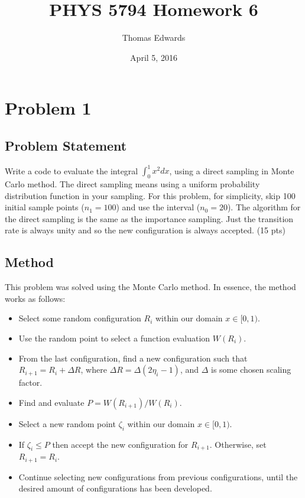 \documentclass[10pt,letter]{article}
\begin{document}
\begin{titlepage}
\title{PHYS 5794 Homework 6}
\date{April 5, 2016}
\author{Thomas Edwards}
\maketitle
\end{titlepage}

\section{Problem 1}

\subsection{Problem Statement}
Write a code to evaluate the integral $\int_0^1 x^2 dx$, using a direct sampling in Monte Carlo method. The
direct sampling means using a uniform probability distribution function in your sampling. For this
problem, for simplicity, skip 100 initial sample points ($n_1 = 100$) and use the interval ($n_0 = 20$). The
algorithm for the direct sampling is the same as the importance sampling. Just the transition rate
is always unity and so the new configuration is always accepted. (15 pts)

\subsection{Method}

This problem was solved using the Monte Carlo method. In essence, the method works as follows:

\begin{itemize}
\item Select some random configuration $R_i$ within our domain $x \in [0,1).$
\item Use the random point to select a function evaluation $W(R_i).$
\item From the last configuration, find a new configuration such that $R_{i+1} = R_i + \Delta R$, where $\Delta R = \Delta(2\eta_i-1)$, and $\Delta$ is some chosen scaling factor.
\item Find and evaluate $P = W(R_{i+1})/W(R_{i})$.
\item Select a new random point $\zeta_i$  within our domain $x \in [0,1).$
\item If $\zeta_i \le P$ then accept the new configuration for $R_{i+1}$. Otherwise, set $R_{i+1}=R_i$.
\item Continue selecting new configurations from previous configurations, until the desired amount of configurations has been developed.
\end{itemize}
\end{document}
